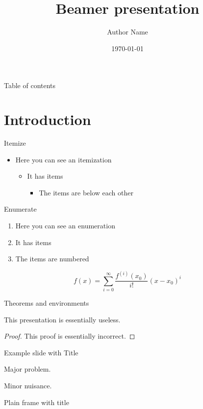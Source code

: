 \documentclass{beamer}
\author{Author Name}
\title{Beamer presentation}
\institute{Pázmány Péter Catholic University}
\date{\today}
\begin{document}
\frame{\maketitle}
\begin{frame}{Table of contents}
	\tableofcontents
\end{frame}

\section{Introduction}
\begin{frame}{Itemize}
\begin{itemize}
\item Here you can see an itemization
\begin{itemize}
\item It has items
\begin{itemize}
\item The items are below each other
\end{itemize}
\end{itemize}
\end{itemize}
\end{frame}

\begin{frame}{Enumerate}
\begin{enumerate}
\item Here you can see an enumeration
\item It has items
\item The items are numbered
\end{enumerate}
\[
	f(x)=\sum_{i=0}^\infty \frac{f^{(i)}(x_0)}{i!}(x-x_0)^i
\]
\end{frame}

\begin{frame}{Theorems and environments}
\begin{theorem}
This presentation is essentially useless.
\end{theorem}
\begin{proof}
This proof is essentially incorrect.
\end{proof}
\end{frame}

\begin{frame}{Example slide with Title}
\begin{example}
Major problem.
\end{example}
\begin{solution}
Minor nuisance.
\end{solution}
\end{frame}

\begin{frame}[plain]{Plain frame with title}
\lipsum[1]
\end{frame}
\end{document}
